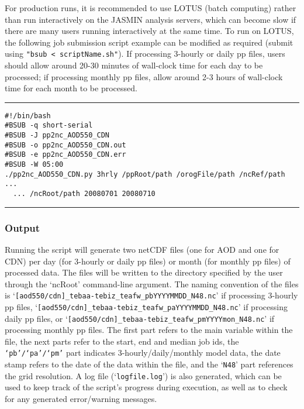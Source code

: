 \documentclass[10pt,a4paper]{article}
\begin{document}
\noindent For production runs, it is recommended to use LOTUS (batch computing) rather than run interactively on the JASMIN analysis servers, which can become slow if there are many users running interactively at the same time. To run on LOTUS, the following job submission script example can be modified as required (submit using \texttt{"bsub < scriptName.sh"}). If processing 3-hourly or daily pp files, users should allow around 20-30 minutes of wall-clock time for each day to be processed; if processing monthly pp files, allow around 2-3 hours of wall-clock time for each month to be processed.\\
\hrule
\begin{spacing}{1}
\begin{lstlisting}
#!/bin/bash
#BSUB -q short-serial
#BSUB -J pp2nc_AOD550_CDN
#BSUB -o pp2nc_AOD550_CDN.out 
#BSUB -e pp2nc_AOD550_CDN.err 
#BSUB -W 05:00
./pp2nc_AOD550_CDN.py 3hrly /ppRoot/path /orogFile/path /ncRef/path ...
  ... /ncRoot/path 20080701 20080710
\end{lstlisting}
\end{spacing}
\hrule

\subsubsection{Output}
Running the script will generate two netCDF files (one for AOD and one for CDN) per day (for 3-hourly or daily pp files) or month (for monthly pp files) of processed data. The files will be written to the directory specified by the user through the `ncRoot' command-line argument. The naming convention of the files is `\texttt{[aod550/cdn]\_tebaa-tebiz\_teafw\_pbYYYYMMDD\_N48.nc}' if processing 3-hourly pp files, `\texttt{[aod550/cdn]\_tebaa-tebiz\_teafw\_paYYYYMMDD\_N48.nc}' if processing daily pp files, or `\texttt{[aod550/cdn]\_tebaa-tebiz\_teafw\_pmYYYYmon\_N48.nc}' if processing monthly pp files. The first part refers to the main variable within the file, the next parts refer to the start, end and median job ids, the \texttt{`pb'/`pa'/`pm'} part indicates 3-hourly/daily/monthly model data, the date stamp refers to the date of the data within the file, and the `\texttt{N48}' part references the grid resolution. A log file (`\texttt{logfile.log}') is also generated, which can be used to keep track of the script's progress during execution, as well as to check for any generated error/warning messages.
\end{document}
